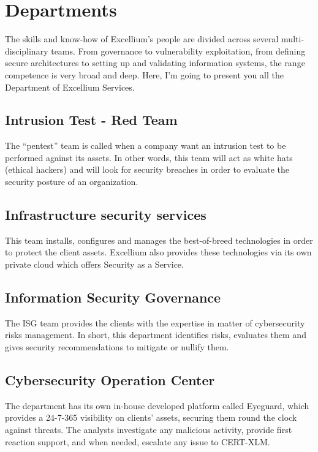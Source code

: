 \documentclass{tnreport}
\begin{document}
\section{Departments}
The skills and know-how of \gls{Excellium}’s people are divided across several multi-disciplinary teams. From governance to vulnerability exploitation, from defining secure architectures to setting up and validating information systems, the range competence is very broad and deep. Here, I'm going to present you all the Department of \gls{Excellium} Services.

\subsection{Intrusion Test - Red Team}
The ``pentest'' team is called when a company want an intrusion test to be performed against its assets. In other words, this team will act as white hats (ethical hackers) and will look for security breaches in order to evaluate the security posture of an organization.

\subsection{Infrastructure security services}
This team installs, configures and manages the best-of-breed technologies in order to protect the client assets. \gls{Excellium} also provides these technologies via its own private cloud which offers Security as a Service.

\subsection{Information Security Governance}
The ISG team provides the clients with the expertise in matter of cybersecurity risks management. In short, this department identifies risks, evaluates them and gives security recommendations to mitigate or nullify them.

\subsection{Cybersecurity Operation Center}\label{soc}
The department has its own in-house developed platform called Eyeguard, which provides a 24-7-365 visibility on clients' assets, securing them round the clock against threats. The analysts investigate any malicious activity, provide first reaction support, and when needed, escalate any issue to \gls{CERT}-XLM.
\end{document}
